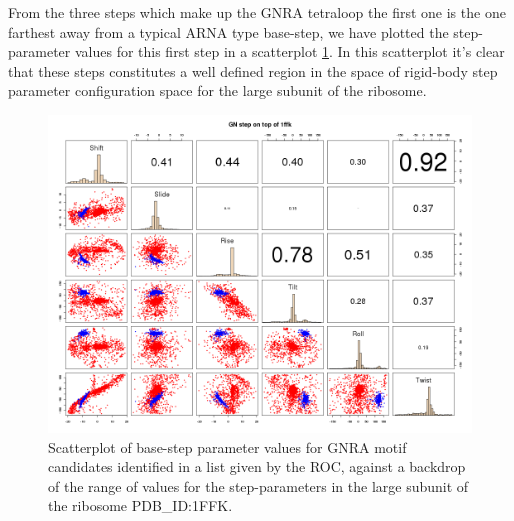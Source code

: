 From the three steps which make up the GNRA tetraloop the first one is
the  one farthest away  from a  typical ARNA  type base-step,  we have
plotted the step-parameter values for this first step in a scatterplot
\ref{fig:scattergnra}. In this scatterplot it's clear that these steps
constitutes  a well  defined region  in the  space of  rigid-body step
parameter configuration space for the large subunit of the ribosome.

\begin{figure}
\centering 
\includegraphics[angle=90, scale=0.5]{Chapter5/GNRAin1ffk.png}
\caption{Scatterplot  of  base-step parameter  values  for GNRA  motif
  candidates identified in a list given by the ROC, against a backdrop
  of the range of values  for the step-parameters in the large subunit
  of the ribosome PDB\_ID:1FFK.}
\label{fig:scattergnra}
\end{figure}




